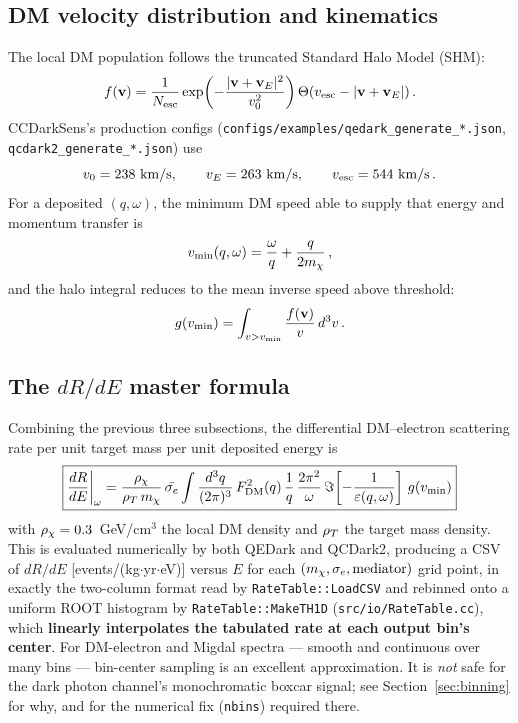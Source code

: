 \subsection{DM velocity distribution and kinematics}

The local DM population follows the truncated Standard Halo Model (SHM):
\begin{equation}
f(\mathbf{v}) = \frac{1}{N_\mathrm{esc}}
\exp\!\left(-\frac{|\mathbf{v}+\mathbf{v}_E|^2}{v_0^2}\right)
\Theta(v_\mathrm{esc}-|\mathbf{v}+\mathbf{v}_E|)\,.
\end{equation}
CCDarkSens's production configs
(\texttt{configs/examples/qedark\_generate\_*.json},
\texttt{qcdark2\_generate\_*.json}) use
\begin{equation}
v_0 = 238\ \mathrm{km/s}, \qquad v_E = 263\ \mathrm{km/s}, \qquad
\vesc = 544\ \mathrm{km/s}\,.
\end{equation}
For a deposited $(q,\omega)$, the minimum DM speed able to supply that
energy and momentum transfer is
\begin{equation}
v_\mathrm{min}(q,\omega) = \frac{\omega}{q} + \frac{q}{2m_\chi}\,,
\end{equation}
and the halo integral reduces to the mean inverse speed above threshold:
\begin{equation}
g(v_\mathrm{min}) = \int_{v>v_\mathrm{min}} \frac{f(\mathbf{v})}{v}\,d^3v\,.
\end{equation}

\subsection{The $dR/dE$ master formula}

Combining the previous three subsections, the differential DM--electron
scattering rate per unit target mass per unit deposited energy is
\begin{equation}
\boxed{
\frac{dR}{dE}\bigg|_\omega = \frac{\rho_\chi}{\rho_T\, m_\chi}\,\bar{\sigma_e}
\int \frac{d^3q}{(2\pi)^3}\, F_\mathrm{DM}^2(q)\,\frac{1}{q}\,\frac{2\pi^2}{\omega}\,
\Im\!\left[-\frac{1}{\varepsilon(q,\omega)}\right]\, g(v_\mathrm{min})
}
\label{eq:dRdE_dme}
\end{equation}
with $\rho_\chi = 0.3$~GeV/cm$^3$ the local DM density and $\rho_T$ the target
mass density. This is evaluated numerically by both QEDark and QCDark2,
producing a CSV of $dR/dE$ [events/(kg$\cdot$yr$\cdot$eV)] versus $E$ for
each $(m_\chi, \sigma_e, \text{mediator})$ grid point, in exactly the
two-column format read by \texttt{RateTable::LoadCSV} and rebinned onto a
uniform ROOT histogram by \texttt{RateTable::MakeTH1D}
(\texttt{src/io/RateTable.cc}), which \textbf{linearly interpolates the
tabulated rate at each output bin's center}. For DM-electron and Migdal
spectra — smooth and continuous over many bins — bin-center sampling is an
excellent approximation. It is \emph{not} safe for the dark photon
channel's monochromatic boxcar signal; see
Section~\ref{sec:binning} for why, and for the numerical fix (\texttt{nbins})
required there.


